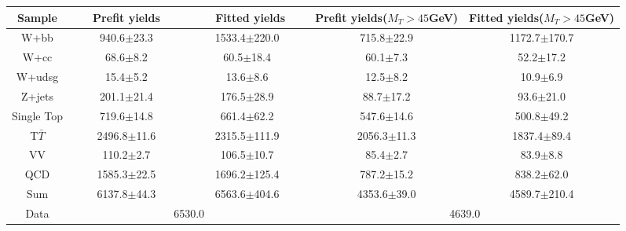  \begin{adjustbox}{width=1.\textwidth,center=\textwidth}
   \begin{tabular} {c|cc|cc} \hline\hline
			 Sample & ~~~Prefit yields~~~ & ~~~~Fitted yields~~~ & Prefit yields($M_T>45$GeV) & Fitted yields($M_T>45$GeV) \\ 
 \hline
W+bb&940.6$\pm$23.3&1533.4$\pm$220.0&715.8$\pm$22.9&1172.7$\pm$170.7\\
W+cc&68.6$\pm$8.2&60.5$\pm$18.4&60.1$\pm$7.3&52.2$\pm$17.2\\
W+udsg&15.4$\pm$5.2&13.6$\pm$8.6&12.5$\pm$8.2&10.9$\pm$6.9\\
Z+jets&201.1$\pm$21.4&176.5$\pm$28.9&88.7$\pm$17.2&93.6$\pm$21.0\\
Single Top&719.6$\pm$14.8&661.4$\pm$62.2&547.6$\pm$14.6&500.8$\pm$49.2\\
T$\bar{T}$&2496.8$\pm$11.6&2315.5$\pm$111.9&2056.3$\pm$11.3&1837.4$\pm$89.4\\
VV&110.2$\pm$2.7&106.5$\pm$10.7&85.4$\pm$2.7&83.9$\pm$8.8\\
QCD&1585.3$\pm$22.5&1696.2$\pm$125.4&787.2$\pm$15.2&838.2$\pm$62.0\\
\hline
Sum &6137.8$\pm$44.3&6563.6$\pm$404.6&4353.6$\pm$39.0&4589.7$\pm$210.4\\
\hline
Data&\multicolumn{2}{c}{6530.0}&\multicolumn{2}{c}{4639.0}\\
   \hline\hline
   \end{tabular}
 \end{adjustbox}
